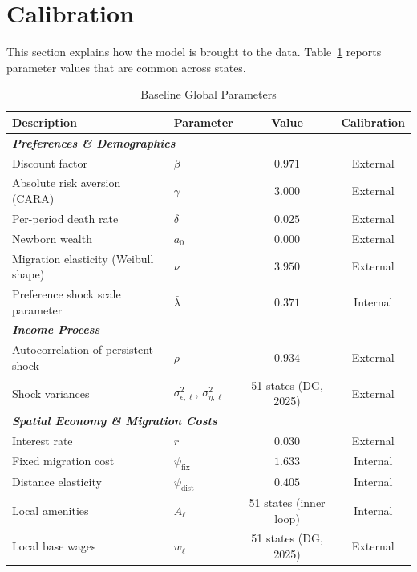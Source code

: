 \documentclass[11pt, a4paper]{article}
\begin{document}
\section{Calibration}
\label{sec:calibration}
This section explains how the model is brought to the data. Table~\ref{tab:baseline_params} reports parameter values that are common across states.

\begin{table}[!htb]
    \centering
    \small
    \caption{Baseline Global Parameters}
    \label{tab:baseline_params}
    \begin{tabular}{llcc}
        \toprule
        \textbf{Description} & \textbf{Parameter} & \textbf{Value} & \textbf{Calibration} \\
        \midrule
        \multicolumn{4}{l}{\textbf{\textit{Preferences \& Demographics}}} \\
        Discount factor & $\beta$ & $0.971$ & External \\
        Absolute risk aversion (CARA) & $\gamma$ & $3.000$ & External \\
        Per-period death rate & $\delta$ & $0.025$ & External \\
        Newborn wealth & $a_0$ & $0.000$ & External \\
        Migration elasticity (Weibull shape) & $\nu$ & $3.950$ & External \\
        Preference shock scale parameter & $\bar{\lambda}$ & $0.371$ & Internal \\
        \midrule
        \multicolumn{4}{l}{\textbf{\textit{Income Process}}} \\
        Autocorrelation of persistent shock & $\rho$ & $0.934$ & External \\
        Shock variances & $\sigma_{\epsilon,\ell}^2$, $\sigma_{\eta,\ell}^2$ & 51 states (DG, 2025) & External \\
        \midrule
        \multicolumn{4}{l}{\textbf{\textit{Spatial Economy \& Migration Costs}}} \\
        Interest rate & $r$ & $0.030$ & External \\
        Fixed migration cost & $\psi_{\text{fix}}$ & $1.633$ & Internal \\
        Distance elasticity & $\psi_{\text{dist}}$ & $0.405$ & Internal \\
        Local amenities & $A_\ell$ & 51 states (inner loop) & Internal \\
        Local base wages & $w_\ell$ & 51 states (DG, 2025) & External \\
        \bottomrule
    \end{tabular}
\end{table}
\end{document}
